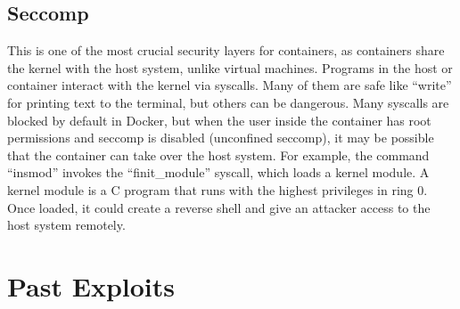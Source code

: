 \documentclass{article}
\begin{document}
\subsection{Seccomp}

This is one of the most crucial security layers for containers, 
as containers share the kernel with the host system, unlike virtual machines.
Programs in the host or container interact with the kernel via syscalls. 
Many of them are safe like ``write'' for printing text to the terminal, but others can be dangerous.
Many syscalls are blocked by default in Docker, but when the user inside the container has root permissions and 
seccomp is disabled (unconfined seccomp), it may be possible that the container can take over the host system.
For example, the command ``insmod'' invokes the ``finit\_module'' syscall, which loads a kernel module. 
A kernel module is a C program that runs with the highest privileges in ring 0. Once loaded, 
it could create a reverse shell and give an attacker access to the host system remotely.



\section{Past Exploits}
\end{document}
